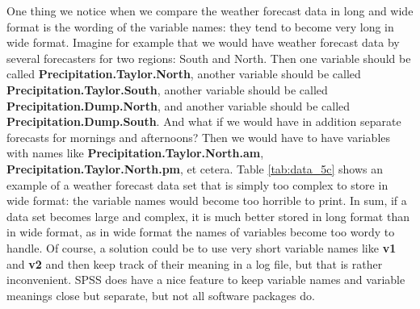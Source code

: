 \begin{kframe}


{\ttfamily\noindent\bfseries{}}

{\ttfamily\noindent\bfseries{}}

{\ttfamily\noindent\bfseries\color{errorcolor}{\#\# Error in eval(expr, envir, enclos): object 'sunshine' not found}}

{\ttfamily\noindent\bfseries\color{errorcolor}{\#\# Error in eval(expr, envir, enclos): object 'precipitation' not found}}

{\ttfamily\noindent\bfseries{}}

{\ttfamily\noindent\bfseries{}}

{\ttfamily\noindent\bfseries{}}\end{kframe}


One thing we notice when we compare the weather forecast data in long and wide format is the wording of the variable names: they tend to become very long in wide format. Imagine for example that we would have weather forecast data by several forecasters for two regions: South and North. Then one variable should be called \textbf{Precipitation.Taylor.North}, another variable should be called \textbf{Precipitation.Taylor.South}, another variable should be called \textbf{Precipitation.Dump.North}, and another variable should be called \textbf{Precipitation.Dump.South}. And what if we would have in addition separate forecasts for mornings and afternoons? Then we would have to have variables with names like \textbf{Precipitation.Taylor.North.am}, \textbf{Precipitation.Taylor.North.pm}, et cetera. Table \ref{tab:data_5c} shows an example of a weather forecast data set that is simply too complex to store in wide format: the variable names would become too horrible to print. In sum, if a data set becomes large and complex, it is much better stored in long format than in wide format, as in wide format the names of variables become too wordy to handle. Of course, a solution could be to use very short variable names like \textbf{v1} and \textbf{v2} and then keep track of their meaning in a log file, but that is rather inconvenient. SPSS does have a nice feature to keep variable names and variable meanings close but separate, but not all software packages do.    


